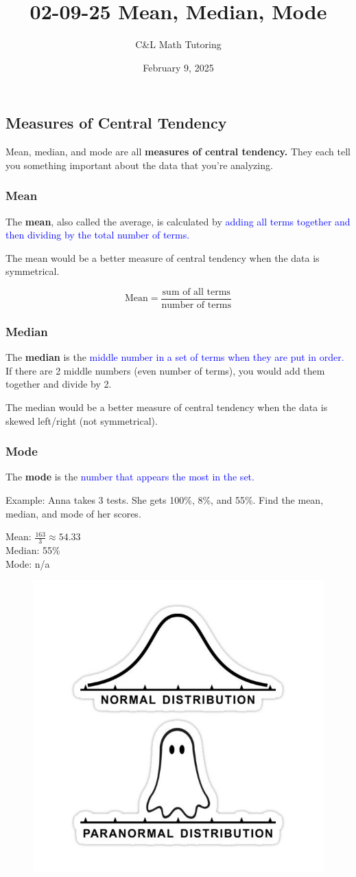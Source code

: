 \documentclass[a4paper, 12pt]{article}
\title{02-09-25 Mean, Median, Mode}
\author{C\&L Math Tutoring}
\date{February 9, 2025}
\begin{document}
\maketitle

\subsection*{Measures of Central Tendency}
Mean, median, and mode are all \textbf{measures of central tendency.} They each tell you something important about the data that you're analyzing.

\subsubsection*{Mean}
The \textbf{mean}, also called the average, is calculated by \textcolor{blue}{adding all terms together and then dividing by the total number of terms.}

The mean would be a better measure of central tendency when the data is symmetrical.

$$\text{Mean} = \frac{\text{sum of all terms}}{\text{number of terms}}$$

\subsubsection*{Median}
The \textbf{median} is the \textcolor{blue}{middle number in a set of terms when they are put in order.} If there are 2 middle numbers (even number of terms), you would add them together and divide by 2.

The median would be a better measure of central tendency when the data is skewed left/right (not symmetrical).

\subsubsection*{Mode}
The \textbf{mode} is the \textcolor{blue}{number that appears the most in the set.}

Example: Anna takes 3 tests. She gets 100\%, 8\%, and 55\%. Find the mean, median, and mode of her scores.

Mean: $\frac{163}{3} \approx 54.33 $\\
Median: 55\% \\
Mode: n/a

\begin{figure}[H]
    \centering
    \includegraphics[width=0.5\linewidth]{meme.jpg}
    \label{fig:enter-label}
\end{figure}
\end{document}
